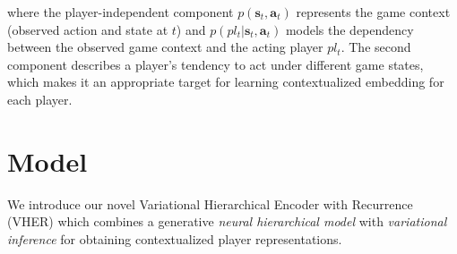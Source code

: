 \documentclass{article}
\newcommand{\generation}{p}
\newcommand{\state}{\mathbf{s}}
\newcommand{\action}{\mathbf{a}}
\newcommand{\reward}{r}
\newcommand{\goal}{g}
\newcommand{\player}{pl}
\newcommand{\home}{\it{Home}}
\newcommand{\away}{\it{Away}}
\newcommand{\none}{\it{Neither}}
\newcommand{\features}{\boldsymbol{x}}
\begin{document}
\noindent where the player-independent component $\generation(\state_{t},\action_{t})$ represents the game context (observed action and state at $t$) and $\generation(\player_{t}|\state_{t},\action_{t})$ models the dependency between the observed game context and the acting player $\player_{t}$.
The second component describes a player's tendency to act under different game states, which makes it an appropriate target for learning contextualized embedding for each player. 



\section{Model}
We introduce our novel Variational Hierarchical Encoder with Recurrence (VHER) which combines a generative {\it neural hierarchical model} with {\it variational inference} for obtaining contextualized player representations. 
\end{document}
